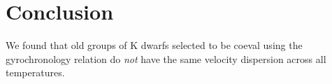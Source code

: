 \section{Conclusion}

We found that old groups of K dwarfs selected to be coeval using the
\citet{angus2019} gyrochronology relation do {\it not} have the same velocity
dispersion across all temperatures.








